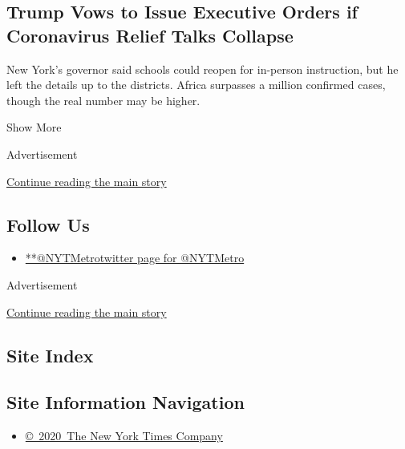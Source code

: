\begin{enumerate}
  \hypertarget{trump-vows-to-issue-executive-orders-if-coronavirus-relief-talks-collapse}{%
  \subsection{Trump Vows to Issue Executive Orders if Coronavirus Relief
  Talks
  Collapse}\label{trump-vows-to-issue-executive-orders-if-coronavirus-relief-talks-collapse}}

  New York's governor said schools could reopen for in-person
  instruction, but he left the details up to the districts. Africa
  surpasses a million confirmed cases, though the real number may be
  higher.
\end{enumerate}

Show More

Advertisement

\protect\hyperlink{after-mid2}{Continue reading the main story}

\hypertarget{follow-us}{%
\subsection{Follow Us}\label{follow-us}}

\begin{itemize}
\tightlist
\item
  \href{https://twitter.com/NYTMetro}{**@NYTMetrotwitter page for
  @NYTMetro}
\end{itemize}

Advertisement

\protect\hyperlink{after-mktg}{Continue reading the main story}

\hypertarget{site-index}{%
\subsection{Site Index}\label{site-index}}

\hypertarget{site-information-navigation}{%
\subsection{Site Information
Navigation}\label{site-information-navigation}}

\begin{itemize}
\tightlist
\item
  \href{https://help.nytimes.com/hc/en-us/articles/115014792127-Copyright-notice}{©~2020~The
  New York Times Company}
\end{itemize}

